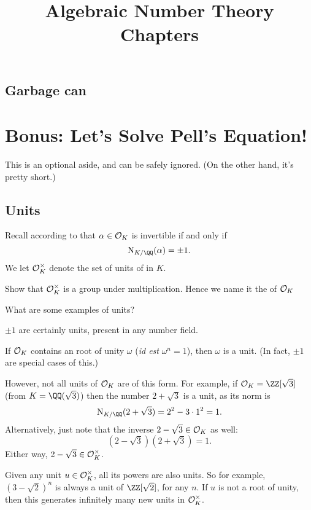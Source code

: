 \documentclass[11pt]{scrreprt}
\begin{document}
\title{Algebraic Number Theory Chapters}
\maketitle
\tableofcontents

\section{Garbage can}
\label{prob:OK_unit_norm}

\chapter{Bonus: Let's Solve Pell's Equation!}
This is an optional aside, and can be safely ignored.
(On the other hand, it's pretty short.)

\section{Units}
Recall according to  that $\alpha \in \mathcal O_K$ is invertible
if and only if \[ \NK(\alpha) = \pm 1. \]
We let $\mathcal O_K^\times$ denote the set of units of in $K$.

\begin{ques}
	Show that $\mathcal O_K^\times$ is a group under multiplication.
	Hence we name it the  of $\mathcal O_K$
\end{ques}

What are some examples of units?
\begin{example}
	\listhack
	\begin{enumerate}
		\ii $\pm 1$ are certainly units, present in any number field.

		\ii If $\mathcal O_K$ contains an root of unity $\omega$ (\emph{id est} $\omega^n=1$),
		then $\omega$ is a unit.
		(In fact, $\pm 1$ are special cases of this.)

		\ii However, not all units of $\mathcal O_K$ are of this form.
		For example, if $\OO_K = \ZZ[\sqrt3]$ (from $K = \QQ(\sqrt3)$) then
		the number $2+\sqrt3$ is a unit, as its norm is
		\[ \NK(2+\sqrt3) = 2^2 - 3 \cdot 1^2 = 1. \]
		Alternatively, just note that the inverse $2-\sqrt3 \in \mathcal O_K$ as well:
		\[ \left( 2-\sqrt3 \right)\left( 2+\sqrt3 \right) = 1. \]
		Either way, $2-\sqrt3 \in \mathcal O_K^\times$.

		\ii Given any unit $u \in \mathcal O_K^\times$, all its powers are also units.
		So for example, $(3-\sqrt2)^n$ is always a unit of $\ZZ[\sqrt2]$, for any $n$.
		If $u$ is not a root of unity, then this generates infinitely many new units in $\mathcal O_K^\times$.
	\end{enumerate}
\end{example}
\end{document}
